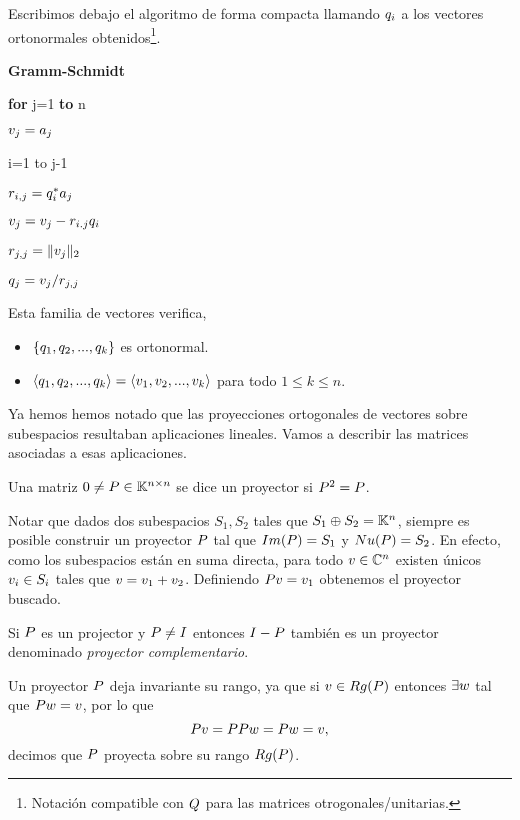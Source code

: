 Escribimos debajo el algoritmo de forma compacta llamando $\qb_i$ a los vectores ortonormales obtenidos\footnote{Notación compatible con $\Qb$ para las matrices otrogonales/unitarias.}.


\begin{center}
\begin{tcolorbox}[width=\linewidth/3]
\begin{center}
{\bf Gramm-Schmidt}
\end{center}


{\bf for} j=1 {\bf to} n

\qquad $\vb_j=\ab_j$

 i=1 to j-1

\qquad\qquad $r_{i,j}=\qb_i^*\ab_j$

\qquad\qquad  $\vb_j=\vb_j-r_{i.j}
\qb_i$


\qquad$r_{j,j}=\|\vb_j\|_2$

\qquad$\qb_{j}=\vb_j/r_{j,j}$

\end{tcolorbox}
\end{center}
Esta familia de vectores verifica,
\begin{itemize}
 \item $\{\qb_1,\qb_2,...,\qb_k\}$ es ortonormal.
 \item $\langle\qb_1,\qb_2,...,\qb_k\rangle=\langle\vb_1,\vb_2,..., \vb_k\rangle$ para todo $1\le k\le n$.
\end{itemize}

Ya hemos hemos notado que las proyecciones ortogonales de vectores sobre subespacios  resultaban aplicaciones lineales.  Vamos a describir las matrices asociadas a esas aplicaciones.
\tccdefi
\begin{definicion}
Una matriz $\cero \neq \Pb\in \Knn$ se dice un proyector si
$\Pb^2=\Pb$.
\end{definicion}
\etcc

Notar que  dados dos subespacios $S_1,S_2$ tales que $S_1\oplus S_2=\mathbb K^{n}$, siempre es posible construir un proyector $\Pb$ tal que $Im(\Pb)=S_1$ y $Nu(\Pb)=S_2$. En efecto, como los subespacios están en suma directa, para todo $\vb\in \Cn$ existen únicos $\vb_i\in S_i$ tales que
$\vb=\vb_1+\vb_2$. Definiendo $\Pb\vb=\vb_1$ obtenemos el proyector buscado.

Si $\Pb$ es un projector y $\Pb\neq \Ib$ entonces $\Ib-\Pb$ también es un proyector denominado \emph{proyector complementario}.

Un proyector $\Pb$ deja invariante su rango, ya que si $\vb\in Rg(\Pb)$ entonces $\exists \wb$ tal que  $\Pb\wb=\vb$, por lo que
$$
\Pb\vb=\Pb\Pb\wb=\Pb\wb=\vb,
$$
decimos que $\Pb$ proyecta sobre su rango $Rg(\Pb)$.

